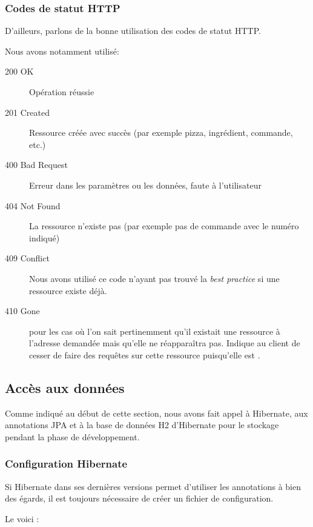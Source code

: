 \subsubsection{Codes de statut HTTP}

D'ailleurs, parlons de la bonne utilisation des codes de statut HTTP.

Nous avons notamment utilisé:

\begin{description}
\item[200 OK] Opération réussie
\item[201 Created] Ressource créée avec succès (par exemple pizza, ingrédient, commande, etc.)
\item[400 Bad Request] Erreur dans les paramètres ou les données, faute à l'utilisateur
\item[404 Not Found] La ressource n'existe pas (par exemple pas de commande avec le numéro indiqué)
\item[409 Conflict] Nous avons utilisé ce code n'ayant pas trouvé la \emph{best practice} si une ressource
                    existe déjà.
\item[410 Gone] pour les cas où l'on sait pertinemment qu'il existait une ressource à l'adresse
                demandée mais qu'elle ne réapparaîtra pas. Indique au client de cesser de faire des
                requêtes sur cette ressource puisqu'elle est .
\end{description}

\subsection{Accès aux données}

Comme indiqué au début de cette section, nous avons fait appel à Hibernate, aux annotations JPA
et à la base de données H2 d'Hibernate pour le stockage pendant la phase de développement.

\subsubsection{Configuration Hibernate}

Si Hibernate dans ses dernières versions permet d'utiliser les annotations à bien des égards, il
est toujours nécessaire de créer un fichier de configuration.

Le voici :

